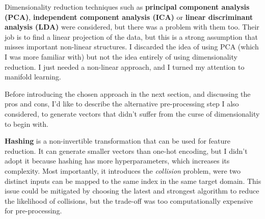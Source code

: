 Dimensionality reduction techniques such as \textbf{principal component analysis (PCA)},
\textbf{independent component analysis (ICA)} or \textbf{linear discriminant analysis (LDA)} were considered,
but there was a problem with them too.
Their job is to find a linear projection of the data, but this is a strong assumption that misses important non-linear
structures. I discarded the idea of using PCA (which I was more familiar with) but not the idea entirely of using dimensionality
reduction. I just needed a non-linear approach, and I turned my attention to manifold learning.

Before introducing the chosen approach in the next section, and discussing the pros and cons,
I'd like to describe the alternative pre-processing step I also considered,
to generate vectors that didn't suffer from the curse of dimensionality to begin with.

\textbf{Hashing} is a non-invertible transformation that can be used for feature reduction.
It can generate smaller vectors than one-hot encoding, but I didn't adopt it
because hashing has more hyperparameters, which increases its complexity.
Most importantly, it introduces the \textit{collision} problem,
were two distinct inputs can be mapped to the same index in the same target domain.
This issue could be mitigated by choosing the latest and strongest algorithm to reduce the likelihood of collisions,
but the trade-off was too computationally expensive for pre-processing.
